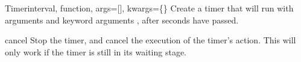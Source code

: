 \begin{classdesc}{Timer}{interval, function, args=[], kwargs=\{\}}
Create a timer that will run  with arguments  and 
keyword arguments , after  seconds have passed.
\end{classdesc}

\begin{methoddesc}{cancel}{}
Stop the timer, and cancel the execution of the timer's action. This will only
work if the timer is still in its waiting stage.
\end{methoddesc}
